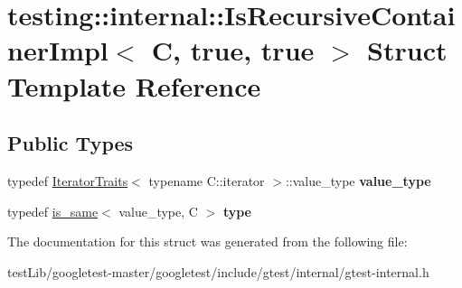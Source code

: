 \hypertarget{structtesting_1_1internal_1_1IsRecursiveContainerImpl_3_01C_00_01true_00_01true_01_4}{}\section{testing\+:\+:internal\+:\+:Is\+Recursive\+Container\+Impl$<$ C, true, true $>$ Struct Template Reference}
\label{structtesting_1_1internal_1_1IsRecursiveContainerImpl_3_01C_00_01true_00_01true_01_4}
\subsection*{Public Types}
\begin{DoxyCompactItemize}
\item 
\mbox{\label{structtesting_1_1internal_1_1IsRecursiveContainerImpl_3_01C_00_01true_00_01true_01_4_a8bbf5f5dec769e84b6f5a2e1fdb503e8}} 
typedef \hyperlink{structtesting_1_1internal_1_1IteratorTraits}{Iterator\+Traits}$<$ typename C\+::iterator $>$\+::value\+\_\+type {\bfseries value\+\_\+type}
\item 
\mbox{\label{structtesting_1_1internal_1_1IsRecursiveContainerImpl_3_01C_00_01true_00_01true_01_4_a6bf4fa07dd1c22c5d0ca4ed99c546e9c}} 
typedef \hyperlink{structtesting_1_1internal_1_1is__same}{is\+\_\+same}$<$ value\+\_\+type, C $>$ {\bfseries type}
\end{DoxyCompactItemize}


The documentation for this struct was generated from the following file\+:\begin{DoxyCompactItemize}
\item 
test\+Lib/googletest-\/master/googletest/include/gtest/internal/gtest-\/internal.\+h\end{DoxyCompactItemize}
